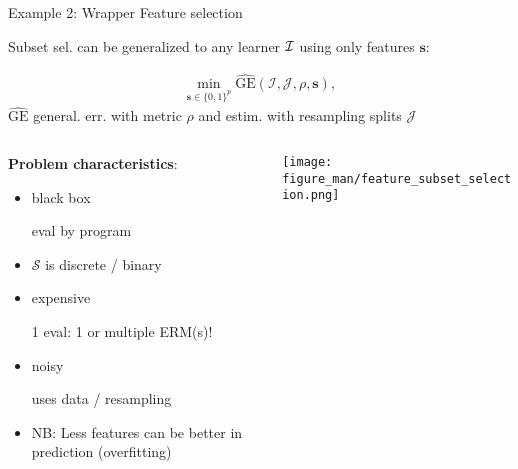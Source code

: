 \documentclass[11pt,compress,t,notes=noshow, xcolor=table]{beamer}
\begin{document}
	
\begin{vbframe}{Example 2: Wrapper Feature selection}

Subset sel. can be generalized to any learner $\mathcal{I}$ using only features $\bm{s}$:

\vspace*{-0.4cm}

\begin{eqnarray*}
	\min_{\textbf{s} \in \{0, 1\}^p} \widehat{\text{GE}}(\mathcal{I}, \mathcal{J}, \rho, \bm{s}),
\end{eqnarray*}
$\widehat{\text{GE}}$ general. err. with metric $\rho$ and estim. with resampling splits $\mathcal{J}$

\vspace*{0.3cm}


\begin{columns}
\begin{column}{0.5\textwidth}
\textbf{Problem characteristics}:
\begin{itemize}
\item black box \\
\begin{footnotesize}eval by program\end{footnotesize}
\item $\mathcal{S}$ is discrete / binary
\item expensive \\
\begin{footnotesize}
1 eval: 1 or multiple ERM(s)!
\end{footnotesize}
\item noisy \\
\begin{footnotesize}
uses data / resampling
\end{footnotesize}
\item NB: Less features can be better in prediction (overfitting)
\end{itemize}
\end{column}
\begin{column}{0.5\textwidth}
\begin{center}
\texttt{[image: figure\_man/feature\_subset\_selection.png]}
\end{center}
\end{column}
\end{columns}



\end{vbframe}
\end{document}
